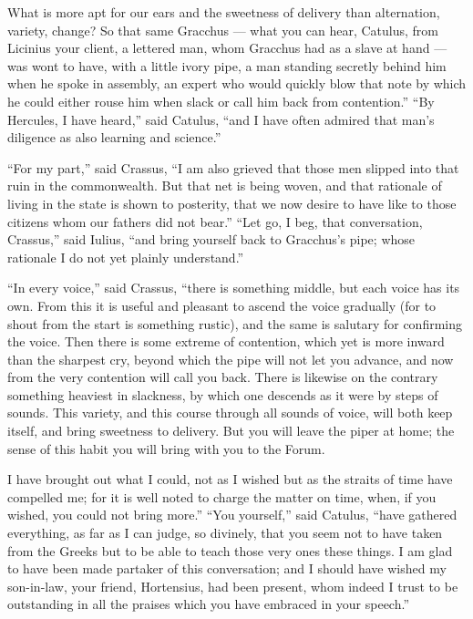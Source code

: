  What is more apt for our ears and the sweetness of delivery than alternation, variety, change? So that same Gracchus — what you can hear, Catulus, from Licinius your client, a lettered man, whom Gracchus had as a slave at hand — was wont to have, with a little ivory pipe, a man standing secretly behind him when he spoke in assembly, an expert who would quickly blow that note by which he could either rouse him when slack or call him back from contention.'' ``By Hercules, I have heard,'' said Catulus, ``and I have often admired that man's diligence as also learning and science.''

 ``For my part,'' said Crassus, ``I am also grieved that those men slipped into that ruin in the commonwealth. But that net is being woven, and that rationale of living in the state is shown to posterity, that we now desire to have like to those citizens whom our fathers did not bear.'' ``Let go, I beg, that conversation, Crassus,'' said Iulius, ``and bring yourself back to Gracchus's pipe; whose rationale I do not yet plainly understand.''

 ``In every voice,'' said Crassus, ``there is something middle, but each voice has its own. From this it is useful and pleasant to ascend the voice gradually (for to shout from the start is something rustic), and the same is salutary for confirming the voice. Then there is some extreme of contention, which yet is more inward than the sharpest cry, beyond which the pipe will not let you advance, and now from the very contention will call you back. There is likewise on the contrary something heaviest in slackness, by which one descends as it were by steps of sounds. This variety, and this course through all sounds of voice, will both keep itself, and bring sweetness to delivery. But you will leave the piper at home; the sense of this habit you will bring with you to the Forum.

 I have brought out what I could, not as I wished but as the straits of time have compelled me; for it is well noted to charge the matter on time, when, if you wished, you could not bring more.'' ``You yourself,'' said Catulus, ``have gathered everything, as far as I can judge, so divinely, that you seem not to have taken from the Greeks but to be able to teach those very ones these things. I am glad to have been made partaker of this conversation; and I should have wished my son-in-law, your friend, Hortensius, had been present, whom indeed I trust to be outstanding in all the praises which you have embraced in your speech.''

